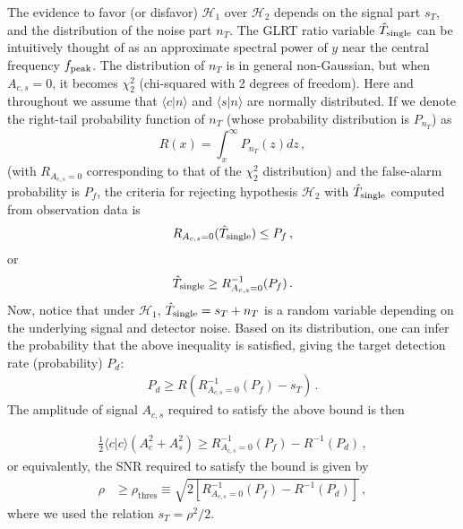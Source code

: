 \documentclass[prd,aps,floatfix,superscriptaddress,nofootinbib,twocolumn,10pt,English]{revtex4-1}
\begin{document}
The evidence to favor (or disfavor) $\mathcal{H}_1$ over
$\mathcal{H}_2$ depends on the signal part $s_T$, and the distribution
of the noise part $n_T$.  The GLRT ratio variable $\hat{T}_{\rm
  single}$ can be intuitively thought of as an approximate spectral
power of $y$ near the central frequency $f_{\rm peak}$. The
distribution of $n_T$ is in general non-Gaussian, but when
$A_{c,s}=0$, it becomes $\chi^2_2$ (chi-squared with 2 degrees of
freedom). Here and throughout we assume that $\langle c|n\rangle$ and
$\langle s|n\rangle$ are normally distributed.
%
If we denote the right-tail probability function of $n_T$ 
(whose probability distribution is $P_{n_T}$) as
\begin{equation}
\label{eq:right-tail}
R(x) = \int^\infty_x P_{n_T}(z) dz\,,
\end{equation} 
(with $R_{A_{c,s}=0}$ corresponding to that of the $\chi^2_2$
distribution) and the false-alarm probability is $P_f$, the criteria
for rejecting hypothesis $\mathcal{H}_2$ with $\hat{T}_{\rm single}$
computed from observation data is
\begin{align}
R_{A_{c,s}=0} (\hat{T}_{\rm single}) \le P_f\,,
\end{align}
or
\begin{align}
\hat{T}_{\rm single}  \ge R^{-1}_{A_{c,s}=0} (P_f)\,.
\end{align}
Now, notice that under $\mathcal{H}_1$, $\hat{T}_{\rm single}=s_T+n_T$ is a random variable depending on the underlying signal and detector noise. Based on its distribution, one can infer the probability that the above inequality is satisfied, giving the target detection rate (probability) $P_d$:
\begin{align}
P_d 
\ge R(R^{-1}_{A_{c,s}=0} (P_f)-s_T)\,.
\end{align}
The amplitude of signal $A_{c,s}$ 
required to satisfy the above bound is then

\begin{align}\label{eq:pass}
\frac{1}{2}\langle c| c \rangle (A^2_c+A^2_s) \ge R^{-1}_{A_{c,s}=0} (P_f)-R^{-1} (P_d)\,,
\end{align} 
or equivalently, the SNR
required to satisfy the bound is given by
\begin{align}
\rho &\ge \rho_\mathrm{thres} \equiv \sqrt{2 [R^{-1}_{A_{c,s}=0} (P_f)-R^{-1} (P_d)]}\,,
\end{align}
where we used the relation $s_T = \rho^2/2$.
\end{document}
